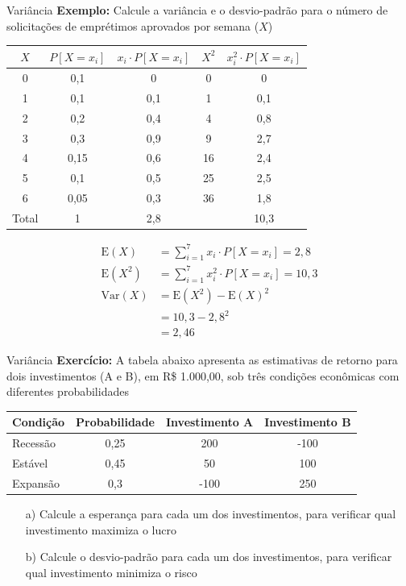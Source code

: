 \documentclass[10pt]{beamer}\usepackage[]{graphicx}\usepackage[]{color}
\providecommand{\E}{\text{E}}
\providecommand{\Var}{\text{Var}}
\theoremstyle{definition}
\begin{document}
\begin{frame}[fragile]{Variância}
  \textbf{Exemplo:} Calcule a variância e o desvio-padrão para  o número
  de solicitações de emprétimos aprovados por semana ($X$)
  \begin{table}[h]
    \centering
    \begin{tabular}{ccccc}
      \hline
      $X$ & $P[X = x_i]$ & $x_i \cdot P[X=x_i]$ & $X^2$ & $x_{i}^{2}
      \cdot P[X=x_i]$ \\
      \hline
      0 & 0,1 & 0 & 0 & 0 \\
      1 & 0,1 & 0,1 & 1 & 0,1 \\
      2 & 0,2 & 0,4 & 4 & 0,8 \\
      3 & 0,3 & 0,9 & 9 & 2,7 \\
      4 & 0,15 & 0,6 & 16 & 2,4  \\
      5 & 0,1 & 0,5 & 25 & 2,5 \\
      6 & 0,05 & 0,3 & 36 & 1,8\\
      \hline
      Total & 1 & 2,8 &   & 10,3 \\
      \hline
    \end{tabular}
  \end{table}
  \begin{small}
  \begin{align*}
    \E(X) &= \textstyle\sum_{i=1}^{7} x_i \cdot P[X = x_i] = 2,8 \\
    \E(X^2) &= \textstyle\sum_{i=1}^{7} x_{i}^2 \cdot P[X = x_i] = 10,3 \\
    \Var(X) &= \E(X^2) - \E(X)^2 \\
            &= 10,3 - 2,8^2 \\
            &= 2,46
  \end{align*}
  \end{small}
\end{frame}

\begin{frame}[fragile]{Variância}
  \textbf{Exercício:} A tabela abaixo apresenta as estimativas de
  retorno para dois investimentos (A e B), em R\$ 1.000,00, sob três
  condições econômicas com diferentes probabilidades
  \begin{table}[h]
    \centering
    \begin{tabular}{lccc}
      \hline
      \textbf{Condição} & \textbf{Probabilidade} & \textbf{Investimento
        A} & \textbf{Investimento B} \\
      \hline
      Recessão & 0,25 & 200 & -100 \\
      Estável & 0,45 & 50 & 100 \\
      Expansão & 0,3 & -100 & 250 \\
      \hline
    \end{tabular}
  \end{table}
  \begin{itemize}
  \item[a)] Calcule a esperança para cada um dos investimentos, para
    verificar qual investimento maximiza o lucro
  \item[b)] Calcule o desvio-padrão para cada um dos investimentos, para
    verificar qual investimento minimiza o risco
  \end{itemize}
\end{frame}
\end{document}
